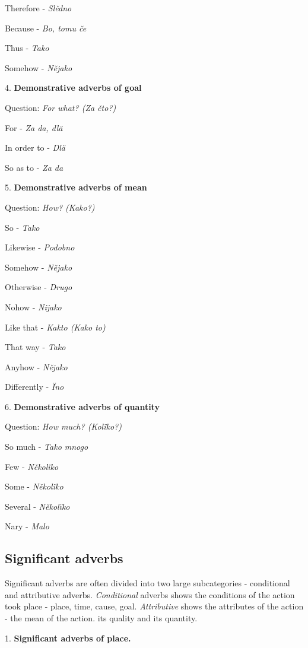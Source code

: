 Therefore - \textit{Slědno}

Because - \textit{Bo, tomu če}

Thus - \textit{Tako}

Somehow - \textit{Nějako}

4. \textbf{Demonstrative adverbs of goal}

Question: \textit{For what? (Za čto?)}

For - \textit{Za da, dlä}

In order to - \textit{Dlä}

So as to - \textit{Za da}

5. \textbf{Demonstrative adverbs of mean}

Question: \textit{How? (Kako?)}

So - \textit{Tako}

Likewise - \textit{Podobno}

Somehow - \textit{Nějako}

Otherwise - \textit{Drugo}

Nohow - \textit{Nijako}

Like that - \textit{Kakto (Kako to)}

That way - \textit{Tako}

Anyhow - \textit{Nějako}

Differently - \textit{Ïno}

6.\textbf{ Demonstrative adverbs of quantity}

Question: \textit{How much? (Kolïko?)}

So much - \textit{Tako mnogo}

Few - \textit{Několïko}

Some - \textit{Několïko}

Several - \textit{Několïko}

Nary - \textit{Malo}


\subsection{Significant adverbs}

Significant adverbs are often divided into two large subcategories - conditional and attributive adverbs. \textit{Conditional} adverbs shows the conditions of the action took place - place, time, cause, goal. \textit{Attributive} shows the attributes of the action - the mean of the action. its quality and its quantity.

1. \textbf{Significant adverbs of place.}

